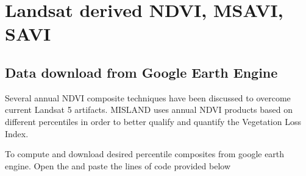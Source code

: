 \documentclass[letterpaper,10pt,english]{sphinxmanual}
\begin{document}
\section{Landsat derived NDVI, MSAVI, SAVI}
\label{\detokenize{Preprocessing/NDVI:landsat-derived-ndvi-msavi-savi}}

\subsection{Data download from Google Earth Engine}
\label{\detokenize{Preprocessing/NDVI:id1}}
\sphinxAtStartPar
Several annual NDVI composite techniques have been discussed to overcome current Landsat 5 artifacts.
MISLAND uses annual NDVI products based on different percentiles in order to better qualify and quantify the Vegetation Loss Index.

\sphinxAtStartPar
To compute and download desired percentile composites from google earth engine. Open the  and paste the lines of code provided below
\end{document}
